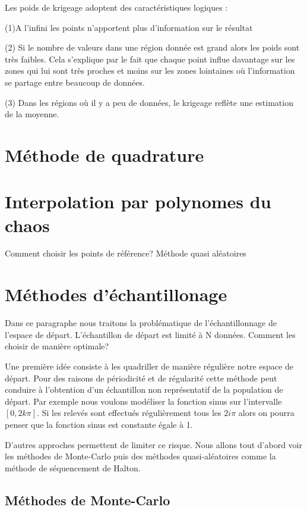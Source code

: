 \documentclass[hidelinks,12pt]{article}
\begin{document}
Les poids de krigeage adoptent des caractéristiques logiques :

(1)A l'infini les points n'apportent plus d'information sur le résultat

(2) Si le nombre de valeurs dans une région donnée est grand alors les poids sont très faibles. Cela s'explique par le fait que chaque point influe davantage sur les zones qui lui sont très proches et moins sur les zones lointaines où l'information se partage entre beaucoup de données.

(3) Dans les régions où il y a peu de données, le krigeage reflète une estimation de la moyenne.

\section{Méthode de quadrature}
\section{Interpolation par polynomes du chaos}


Comment choisir les points de référence? Méthode quasi aléatoires
\section{Méthodes d’échantillonage}

Dans ce paragraphe nous traitons la problématique de l’échantillonnage de l’espace de départ. L’échantillon de départ est limité à N données. Comment les choisir de manière optimale? 

Une première idée consiste à les quadriller de manière régulière notre espace de départ. Pour des raisons de périodicité et de régularité cette méthode peut conduire à l’obtention d’un échantillon non représentatif de la population de départ. Par exemple nous voulons modéliser la fonction sinus sur l’intervalle $[0,2k\pi ]$. Si les relevés sont effectués régulièrement tous les $2i\pi$ alors on pourra penser que la fonction sinus est constante égale à 1. 

D’autres approches permettent de limiter ce risque. Nous allons tout d’abord voir les méthodes de Monte-Carlo puis des méthodes quasi-aléatoires comme la méthode de séquencement de Halton.

\subsection{Méthodes de Monte-Carlo}
\end{document}
